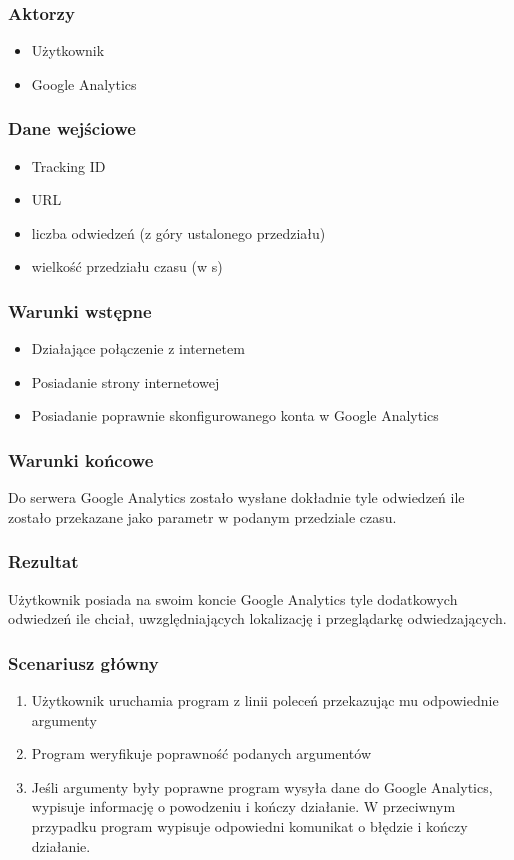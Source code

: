 \documentclass{article}
\begin{document}
\subsubsection{Aktorzy}
\begin{itemize}
\item Użytkownik
\item Google Analytics
\end{itemize}

\subsubsection{Dane wejściowe}
\begin{itemize}
\item Tracking ID
\item URL
\item liczba odwiedzeń (z góry ustalonego przedziału)
\item wielkość przedziału czasu (w s)
\end{itemize}

\subsubsection{Warunki wstępne}
\begin{itemize}
\item Działające połączenie z internetem
\item Posiadanie strony internetowej
\item Posiadanie poprawnie skonfigurowanego konta w Google Analytics
\end{itemize}

\subsubsection{Warunki końcowe}
Do serwera Google Analytics zostało wysłane dokładnie tyle odwiedzeń ile zostało przekazane jako parametr w podanym przedziale czasu.

\subsubsection{Rezultat}
Użytkownik posiada na swoim koncie Google Analytics tyle dodatkowych odwiedzeń ile chciał, uwzględniających lokalizację i przeglądarkę odwiedzających.

\subsubsection{Scenariusz główny}
\begin{enumerate}
\item Użytkownik uruchamia program z linii poleceń przekazując mu odpowiednie argumenty
\item Program weryfikuje poprawność podanych argumentów
\item Jeśli argumenty były poprawne program wysyła dane do Google Analytics, wypisuje informację o powodzeniu i kończy działanie. W przeciwnym przypadku program wypisuje odpowiedni komunikat o błędzie i kończy działanie.
\end{enumerate}
\end{document}
